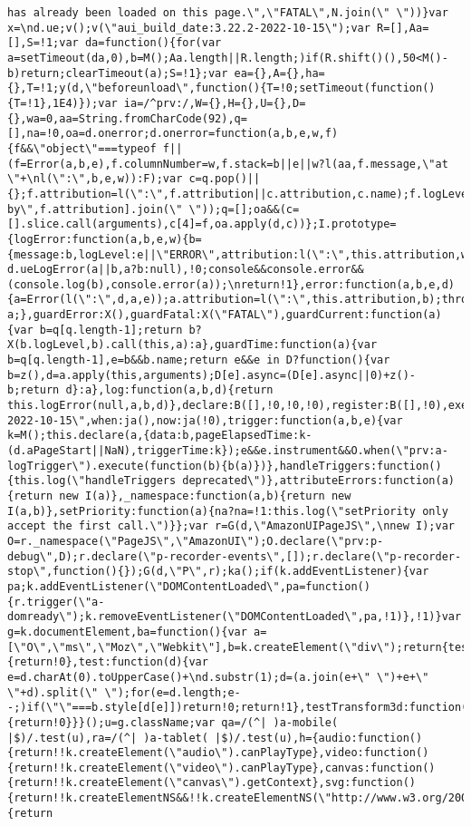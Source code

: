 \documentclass[
]{article}
\begin{document}
\begin{verbatim}
has already been loaded on this page.\",\"FATAL\",N.join(\" \"))}var x=\nd.ue;v();v(\"aui_build_date:3.22.2-2022-10-15\");var R=[],Aa=[],S=!1;var da=function(){for(var a=setTimeout(da,0),b=M();Aa.length||R.length;)if(R.shift()(),50<M()-b)return;clearTimeout(a);S=!1};var ea={},A={},ha={},T=!1;y(d,\"beforeunload\",function(){T=!0;setTimeout(function(){T=!1},1E4)});var ia=/^prv:/,W={},H={},U={},D={},wa=0,aa=String.fromCharCode(92),q=[],na=!0,oa=d.onerror;d.onerror=function(a,b,e,w,f){f&&\"object\"===typeof f||(f=Error(a,b,e),f.columnNumber=w,f.stack=b||e||w?l(aa,f.message,\"at \"+\nl(\":\",b,e,w)):F);var c=q.pop()||{};f.attribution=l(\":\",f.attribution||c.attribution,c.name);f.logLevel=c.logLevel;f.attribution&&console&&console.log&&console.log([f.logLevel||\"ERROR\",a,\"thrown by\",f.attribution].join(\" \"));q=[];oa&&(c=[].slice.call(arguments),c[4]=f,oa.apply(d,c))};I.prototype={logError:function(a,b,e,w){b={message:b,logLevel:e||\"ERROR\",attribution:l(\":\",this.attribution,w)};if(d.ueLogError)return d.ueLogError(a||b,a?b:null),!0;console&&console.error&&(console.log(b),console.error(a));\nreturn!1},error:function(a,b,e,d){a=Error(l(\":\",d,a,e));a.attribution=l(\":\",this.attribution,b);throw a;},guardError:X(),guardFatal:X(\"FATAL\"),guardCurrent:function(a){var b=q[q.length-1];return b?X(b.logLevel,b).call(this,a):a},guardTime:function(a){var b=q[q.length-1],e=b&&b.name;return e&&e in D?function(){var b=z(),d=a.apply(this,arguments);D[e].async=(D[e].async||0)+z()-b;return d}:a},log:function(a,b,d){return this.logError(null,a,b,d)},declare:B([],!0,!0,!0),register:B([],!0),execute:B([]),\nAUI_BUILD_DATE:\"3.22.2-2022-10-15\",when:ja(),now:ja(!0),trigger:function(a,b,e){var k=M();this.declare(a,{data:b,pageElapsedTime:k-(d.aPageStart||NaN),triggerTime:k});e&&e.instrument&&O.when(\"prv:a-logTrigger\").execute(function(b){b(a)})},handleTriggers:function(){this.log(\"handleTriggers deprecated\")},attributeErrors:function(a){return new I(a)},_namespace:function(a,b){return new I(a,b)},setPriority:function(a){na?na=!1:this.log(\"setPriority only accept the first call.\")}};var r=G(d,\"AmazonUIPageJS\",\nnew I);var O=r._namespace(\"PageJS\",\"AmazonUI\");O.declare(\"prv:p-debug\",D);r.declare(\"p-recorder-events\",[]);r.declare(\"p-recorder-stop\",function(){});G(d,\"P\",r);ka();if(k.addEventListener){var pa;k.addEventListener(\"DOMContentLoaded\",pa=function(){r.trigger(\"a-domready\");k.removeEventListener(\"DOMContentLoaded\",pa,!1)},!1)}var g=k.documentElement,ba=function(){var a=[\"O\",\"ms\",\"Moz\",\"Webkit\"],b=k.createElement(\"div\");return{testGradients:function(){return!0},test:function(d){var e=d.charAt(0).toUpperCase()+\nd.substr(1);d=(a.join(e+\" \")+e+\" \"+d).split(\" \");for(e=d.length;e--;)if(\"\"===b.style[d[e]])return!0;return!1},testTransform3d:function(){return!0}}}();u=g.className;var qa=/(^| )a-mobile( |$)/.test(u),ra=/(^| )a-tablet( |$)/.test(u),h={audio:function(){return!!k.createElement(\"audio\").canPlayType},video:function(){return!!k.createElement(\"video\").canPlayType},canvas:function(){return!!k.createElement(\"canvas\").getContext},svg:function(){return!!k.createElementNS&&!!k.createElementNS(\"http://www.w3.org/2000/svg\",\n\"svg\").createSVGRect},offline:function(){return 
\end{verbatim}
\end{document}
